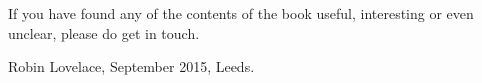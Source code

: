 If you have found any of the contents of the book useful, interesting
or even unclear, please do get in touch.

Robin Lovelace, September 2015, Leeds.




% 
% 
% 


